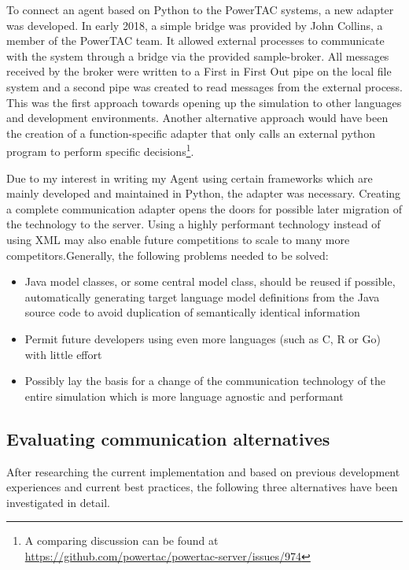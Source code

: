 To connect an agent based on Python to the \ac{PowerTAC} systems, a new adapter was developed. In early 2018, a simple bridge
was provided by John Collins, a member of the \ac{PowerTAC} team. It allowed external processes to communicate with the
system through a bridge via the provided sample-broker. All messages received by the broker were written to a First in
First Out pipe on the local file system and a second pipe was created to read messages from the external process. This
was the first approach towards opening up the simulation to other languages and development environments. Another
alternative approach would have been the creation of a function-specific adapter that only calls an external python
program to perform specific decisions\footnote{A comparing discussion can be found at
\url{https://github.com/powertac/powertac-server/issues/974}}. 

Due to my interest in writing my Agent using certain frameworks which are mainly developed and maintained in Python, the
adapter was necessary. Creating a complete communication adapter opens the doors for possible later migration of the
technology to the server. Using a highly performant technology instead of using \ac{XML} may also enable future
competitions to scale to many more competitors.Generally, the following problems needed to be solved:

\begin{itemize}
    \item Java model classes, or some central model class, should be reused if possible, automatically generating target
        language model definitions from the Java source code to avoid duplication of semantically identical information
    \item Permit future developers using even more languages (such as C, R or Go) with little effort
    \item Possibly lay the basis for a change of the communication technology of the entire simulation which is more
        language agnostic and performant
\end{itemize}

\subsection{Evaluating communication alternatives}%
\label{sub:evaluating_communication_alternatives}

After researching the current implementation and based on previous development experiences and current best practices,
the following three alternatives have been investigated in detail.


